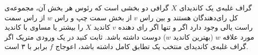 گراف غلبه‌ی یک کاندیدای
$X$
گرافی دو بخشی است که رئوس هر بخش آن، مجموعه‌ی کل رای‌دهندگان هستند و بین راس
$v$
از بخش سمت چپ و راس
$w$
از راس سمت راست یالی وجود دارد اگر و تنها اگر رای دهنده
$v$
کاندید
$X$
را بیشتر یا مساوی با کاندید مورد علاقه
$w$
(بهترین کاندید $w$) دوست داشته باشد. ثابت کنید در یک ورودی متریک اگر گراف غلبه‌ی کاندیدای منتخب یک  تطابق کامل داشته باشد، اعوجاج
$f$
برابر با ۳ است.
